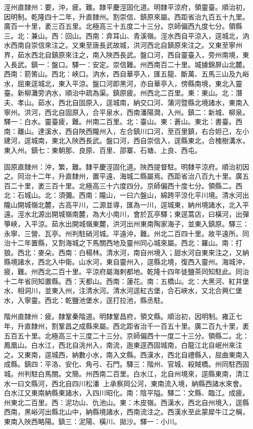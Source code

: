 \begin{pinyinscope}
涇州直隸州：要，沖，疲。難。隸平慶涇固化道。明隸平涼府，領靈臺。順治初，因明制。乾隆四十二年，升直隸州。割崇信、鎮原來屬。西距省治九百五十九里。廣百一十里，袤三百五里。北極高三十五度二十三分。京師偏西九度七分。領縣三。北：兼山。西：回山。西南：弇耳山、青溪嶺。涇水西自平涼入，逕城北，汭水西南自崇信來注之。又東至唐長武故城，洪河西北自鎮原來注之。又東至寧州界，茹水西北自鎮原來注之，南入陜西長武。盤口河，西自靈臺入，旁州南境，東入長武。鎮一：盤口。驛一：安定。崇信難。州西南百二十里。城據錦屏山北麓。西南：箭筈山。西北：峽口。汭水，西自華亭入，匯五龍、斷萬、五馬三山及九峪水，屈東逕城北，東入平涼。盤口河即黑河，亦自華亭入，傍縣南境，東北入靈臺。新柳灘旁汭水，順治中疏為渠。鎮原疲。州西北二百里。東：東山。北：潛夫、孝山。茹水，西北自固原入，逕城南，納交口河、蒲河暨縣北境諸水，東南入寧州。洪河，西北自固原入，合平泉水，西南潘陽澗，入州。鎮二：新城、柳泉。驛一：白水。靈臺疲，難。州南二百里。北：臺山。東：蒼山。東北：書臺。西南：離山。達溪水，西自陜西隴州入，左合鎮川口河，至百里鎮，右合妲己，左小建河，逕城南，東北入陜西長武。盤口河，西自崇信入，逕縣東北，合槐樹溝水，東入州。鎮七：東朝那、良原、百里、邵寨、石塘、上良、西屯。

固原直隸州：沖，繁，難。隸平慶涇固化道。陜西提督駐。明隸平涼府。順治初因之。同治十二年，升直隸州，置平遠、海城二縣屬焉。西距省治八百九十里。廣五百二十里，袤三百十里。北極高三十六度四分。京師偏西十度七分。領縣二。西北：石城山。北：須彌。西南：隴山，一曰六盤山，綿跨平涼化平川境。清水河出隴山開城嶺北麓，古高平川，二源並導，匯為一川，逕城東，納州境諸水，北入平遠。涇水北源出開城嶺南麓，為大小南川，會於瓦亭驛；東逕蒿店，曰橫河，出彈箏峽，入平涼。茹水出開城嶺東麓，洪河出州東南陶家海子，並東入鎮原。驛三：永寧、三營、瓦亭。州判駐硝河城。平遠沖，難。州北二百四十里。故平遠所。同治十二年置縣，又割海城之下馬關西地及靈州同心城來屬。西北：羅山。南：打狼。西北：麥朵。西南：白楊林。清水河，南自州境入；甜水河自東來注之，又納縣境諸水，西北入中衛。山水河，東自靈州入，逕縣北境，復西入靈州。海城沖，疲，難。州西北二百十里。平涼府屬海剌都地。乾隆十四年徙鹽茶同知駐此。同治十二年省同知置縣。西：天都山。西南：蓮花。南：五橋山。北：大黑河、紅井堡水、相洞川，並東入州，注清水河。清水河逕紅古堡，合石峽水，又北合興仁堡水，入寧靈。西北：乾鹽池堡水，逕打拉池，縣丞駐。

階州直隸州：疲。隸鞏秦階道。明隸鞏昌府，領文縣。順治初，因明制。雍正七年，升直隸州，割鞏昌之成縣來屬。西北距省治千一百五十里。廣二百九十里，袤五百五十里。北極高三十三度二十三分。京師偏西十一度二十三分。領縣二。北：鳳凰山。白水江，西北自洮州入，南流，迤東逕西固城南，白龍江北自岷州來注之。又東南，逕城西，納數小水，南入文縣。西漢水，西北自禮縣入，屈曲東南入成縣。鎮四：平洛、安化、角弓、石門。驛三：階州、官城、殺賊橋。州同駐西固城。州判駐白馬關。文簡。州西南二百里。白水江，北自州境來，逕縣東南，清江水一曰文縣河，西北自四川松潘，上承察岡公河，東南流入境，納縣西諸水來會。白水江又東南納縣東諸水，入四川昭化。南：陰平隘。驛二：文縣、臨江。成疲。州東北二百里。西：泥功山、仇池山。東：木皮嶺。西漢水，西北自州境入，逕縣西南，黑峪河出縣北山中，納縣境諸水，西南流注之。西漢水至此蒙犀牛江之稱，東南入陜西略陽。鎮三：泥陽、橫川、拋沙。驛一：小川。


\end{pinyinscope}

